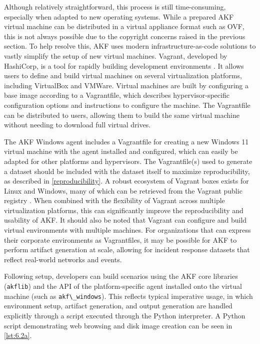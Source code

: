 \documentclass[preprint,12pt]{elsarticle}
\newcommand{\passthrough}[1]{#1}
\begin{document}
Although relatively straightforward, this process is still
time-consuming, especially when adapted to new operating systems. While
a prepared AKF virtual machine can be distributed in a virtual appliance
format such as OVF, this is not always possible due to the copyright
concerns raised in the previous section. To help resolve this, AKF uses
modern infrastructure-as-code solutions to vastly simplify the setup of
new virtual machines. Vagrant, developed by HashiCorp, is a tool for
rapidly building development environments
\citep{HashicorpVagrant2025}. It allows users to define and build
virtual machines on several virtualization platforms, including
VirtualBox and VMWare. Virtual machines are built by configuring a base
image according to a Vagrantfile, which describes hypervisor-specific
configuration options and instructions to configure the machine. The
Vagrantfile can be distributed to users, allowing them to build the same
virtual machine without needing to download full virtual drives.

The AKF Windows agent includes a Vagrantfile for creating a new Windows
11 virtual machine with the agent installed and configured, which can
easily be adapted for other platforms and hypervisors. The
Vagrantfile(s) used to generate a dataset should be included with the
dataset itself to maximize reproducibility, as described in
\autoref{reproducibility}. A robust ecosystem of Vagrant boxes exists
for Linux and Windows, many of which can be retrieved from the Vagrant
public registry \citep{hashicorpHashiCorpCloudPlatform}. When
combined with the flexibility of Vagrant across multiple virtualization
platforms, this can significantly improve the reproducibility and
usability of AKF. It should also be noted that Vagrant can configure and
build virtual environments with multiple machines. For organizations
that can express their corporate environments as Vagrantfiles, it may be
possible for AKF to perform artifact generation at scale, allowing for
incident response datasets that reflect real-world networks and events.

Following setup, developers can build scenarios using the AKF core
libraries (\passthrough{\lstinline!akflib!}) and the API of the
platform-specific agent installed onto the virtual machine (such as
\passthrough{\lstinline!akf\_windows!}). This reflects typical
imperative usage, in which environment setup, artifact generation, and
output generation are handled explicitly through a script executed
through the Python interpreter. A Python script demonstrating web
browsing and disk image creation can be seen in \autoref{lst:6.2a}.
\end{document}
